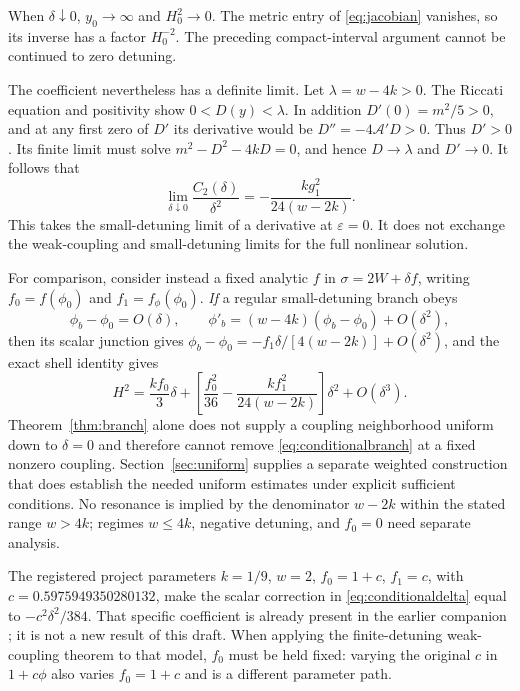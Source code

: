 \documentclass[11pt]{article}
\newcommand{\eps}{\varepsilon}
\begin{document}
When $\delta\downarrow0$, $y_0\to\infty$ and $H_0^2\to0$. The metric entry of \eqref{eq:jacobian} vanishes, so its inverse has a factor $H_0^{-2}$. The preceding compact-interval argument cannot be continued to zero detuning.

The coefficient nevertheless has a definite limit. Let $\lambda=w-4k>0$. The Riccati equation and positivity show $0<D(y)<\lambda$. In addition $D'(0)=m^2/5>0$, and at any first zero of $D'$ its derivative would be
$D''=-4\mathcal A'D>0$. Thus $D'>0$. Its finite limit must solve $m^2-D^2-4kD=0$, and hence $D\to\lambda$ and $D'\to0$. It follows that
\begin{equation}
\lim_{\delta\downarrow0}\frac{C_2(\delta)}{\delta^2}
=-\frac{kg_1^2}{24(w-2k)}.\label{eq:coefficientlimit}
\end{equation}
This takes the small-detuning limit of a derivative at $\eps=0$. It does not exchange the weak-coupling and small-detuning limits for the full nonlinear solution.

For comparison, consider instead a fixed analytic $f$ in $\sigma=2W+\delta f$, writing $f_0=f(\phi_0)$ and $f_1=f_\phi(\phi_0)$. \emph{If} a regular small-detuning branch obeys
\begin{equation}
\phi_b-\phi_0=O(\delta),\qquad
\phi'_b=(w-4k)(\phi_b-\phi_0)+O(\delta^2),
\label{eq:conditionalbranch}
\end{equation}
then its scalar junction gives
$\phi_b-\phi_0=-f_1\delta/[4(w-2k)]+O(\delta^2)$, and the exact shell identity gives
\begin{equation}
H^2=\frac{kf_0}{3}\delta+
\left[\frac{f_0^2}{36}-\frac{kf_1^2}{24(w-2k)}\right]\delta^2
+O(\delta^3).\label{eq:conditionaldelta}
\end{equation}
Theorem~\ref{thm:branch} alone does not supply a coupling neighborhood uniform down to $\delta=0$ and therefore cannot remove \eqref{eq:conditionalbranch} at a fixed nonzero coupling. Section~\ref{sec:uniform} supplies a separate weighted construction that does establish the needed uniform estimates under explicit sufficient conditions. No resonance is implied by the denominator $w-2k$ within the stated range $w>4k$; regimes $w\le4k$, negative detuning, and $f_0=0$ need separate analysis.

The registered project parameters $k=1/9$, $w=2$, $f_0=1+c$, $f_1=c$, with $c=0.5975949350280132$, make the scalar correction in \eqref{eq:conditionaldelta} equal to $-c^2\delta^2/384$. That specific coefficient is already present in the earlier companion \cite{companion}; it is not a new result of this draft. When applying the finite-detuning weak-coupling theorem to that model, $f_0$ must be held fixed: varying the original $c$ in $1+c\phi$ also varies $f_0=1+c$ and is a different parameter path.
\end{document}
